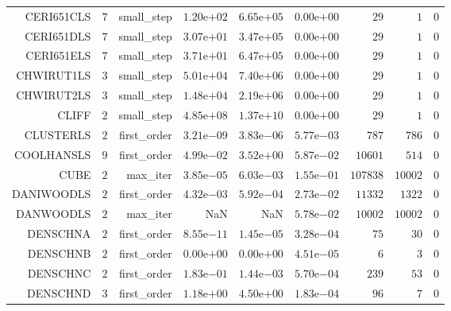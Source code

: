 \begin{longtable}{rrrrrrrrr}
CERI651CLS & \(     7\) & small\_step & \( 1.20\)e\(+02\) & \( 6.65\)e\(+05\) & \( 0.00\)e\(+00\) & \(    29\) & \(     1\) & \(     0\) \\
CERI651DLS & \(     7\) & small\_step & \( 3.07\)e\(+01\) & \( 3.47\)e\(+05\) & \( 0.00\)e\(+00\) & \(    29\) & \(     1\) & \(     0\) \\
CERI651ELS & \(     7\) & small\_step & \( 3.71\)e\(+01\) & \( 6.47\)e\(+05\) & \( 0.00\)e\(+00\) & \(    29\) & \(     1\) & \(     0\) \\
CHWIRUT1LS & \(     3\) & small\_step & \( 5.01\)e\(+04\) & \( 7.40\)e\(+06\) & \( 0.00\)e\(+00\) & \(    29\) & \(     1\) & \(     0\) \\
CHWIRUT2LS & \(     3\) & small\_step & \( 1.48\)e\(+04\) & \( 2.19\)e\(+06\) & \( 0.00\)e\(+00\) & \(    29\) & \(     1\) & \(     0\) \\
CLIFF & \(     2\) & small\_step & \( 4.85\)e\(+08\) & \( 1.37\)e\(+10\) & \( 0.00\)e\(+00\) & \(    29\) & \(     1\) & \(     0\) \\
CLUSTERLS & \(     2\) & first\_order & \( 3.21\)e\(-09\) & \( 3.83\)e\(-06\) & \( 5.77\)e\(-03\) & \(   787\) & \(   786\) & \(     0\) \\
COOLHANSLS & \(     9\) & first\_order & \( 4.99\)e\(-02\) & \( 3.52\)e\(+00\) & \( 5.87\)e\(-02\) & \( 10601\) & \(   514\) & \(     0\) \\
CUBE & \(     2\) & max\_iter & \( 3.85\)e\(-05\) & \( 6.03\)e\(-03\) & \( 1.55\)e\(-01\) & \(107838\) & \( 10002\) & \(     0\) \\
DANIWOODLS & \(     2\) & first\_order & \( 4.32\)e\(-03\) & \( 5.92\)e\(-04\) & \( 2.73\)e\(-02\) & \( 11332\) & \(  1322\) & \(     0\) \\
DANWOODLS & \(     2\) & max\_iter &       NaN &       NaN & \( 5.78\)e\(-02\) & \( 10002\) & \( 10002\) & \(     0\) \\
DENSCHNA & \(     2\) & first\_order & \( 8.55\)e\(-11\) & \( 1.45\)e\(-05\) & \( 3.28\)e\(-04\) & \(    75\) & \(    30\) & \(     0\) \\
DENSCHNB & \(     2\) & first\_order & \( 0.00\)e\(+00\) & \( 0.00\)e\(+00\) & \( 4.51\)e\(-05\) & \(     6\) & \(     3\) & \(     0\) \\
DENSCHNC & \(     2\) & first\_order & \( 1.83\)e\(-01\) & \( 1.44\)e\(-03\) & \( 5.70\)e\(-04\) & \(   239\) & \(    53\) & \(     0\) \\
DENSCHND & \(     3\) & first\_order & \( 1.18\)e\(+00\) & \( 4.50\)e\(+00\) & \( 1.83\)e\(-04\) & \(    96\) & \(     7\) & \(     0\) \\

\end{longtable}
